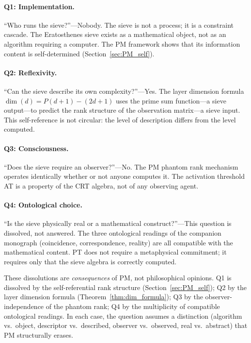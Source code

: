 \documentclass[12pt,a4paper]{article}
\begin{document}
\paragraph{Q1: Implementation.}
``Who runs the sieve?''---Nobody.  The sieve is not a process; it is
a constraint cascade.  The Eratosthenes sieve exists as a mathematical
object, not as an algorithm requiring a computer.  The PM framework
shows that its information content is self-determined
(Section~\ref{sec:PM_self}).

\paragraph{Q2: Reflexivity.}
``Can the sieve describe its own complexity?''---Yes.  The layer
dimension formula $\dim(d) = P(d{+}1) - (2d{+}1)$ uses the prime sum
function---a sieve output---to predict the rank structure of the
observation matrix---a sieve input.  This self-reference is not
circular: the level of description differs from the level computed.

\paragraph{Q3: Consciousness.}
``Does the sieve require an observer?''---No.  The PM phantom rank
mechanism operates identically whether or not anyone computes it.
The activation threshold AT is a property of the CRT algebra, not
of any observing agent.

\paragraph{Q4: Ontological choice.}
``Is the sieve physically real or a mathematical construct?''---This
question is dissolved, not answered.  The three ontological readings
of the companion monograph (coincidence, correspondence, reality)
are all compatible with the mathematical content.  PT does not require
a metaphysical commitment; it requires only that the sieve algebra
is correctly computed.

\begin{remark}
These dissolutions are \emph{consequences} of PM, not philosophical
opinions.  Q1 is dissolved by the self-referential rank structure
(Section~\ref{sec:PM_self}); Q2 by the layer dimension formula
(Theorem~\ref{thm:dim_formula}); Q3 by the observer-independence of
the phantom rank; Q4 by the multiplicity of compatible ontological
readings.  In each case, the question assumes a distinction (algorithm
vs.\ object, descriptor vs.\ described, observer vs.\ observed, real
vs.\ abstract) that PM structurally erases.
\end{remark}
\end{document}
